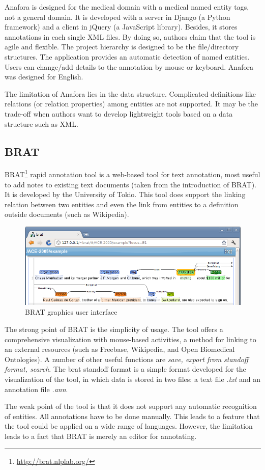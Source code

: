 Anafora is designed for the medical domain with a medical named entity tags, not a general domain.
It is developed with a server in Django (a Python framework) and a client in jQuery (a JavaScript library).
Besides, it stores annotations in each single XML files.
By doing so, authors claim that the tool is agile and flexible.
The project hierarchy is designed to be the file/directory structures.
The application provides an automatic detection of named entities.
Users can change/add details to the annotation by mouse or keyboard.
Anafora was designed for English.

The limitation of Anafora lies in the data structure.
Complicated definitions like relations (or relation properties) among entities
are not supported. It may be the trade-off when authors want to develop lightweight
tools based on a data structure such as XML.

\subsection{BRAT}

BRAT\footnote{\url{http://brat.nlplab.org/}} rapid annotation tool is a web-based tool for text annotation,
most useful to add notes to existing text documents (taken from the introduction of BRAT).
It is developed by the University of Tokio.
This tool does support the linking relation between two entities and even the link from entities to a definition outside documents (such as Wikipedia).

\begin{figure}[!htb]
	\centering
	\includegraphics[width=\textwidth]{Images/brat}
	\caption{BRAT graphics user interface}
	\label{fig:Second}
\end{figure}

The strong point of BRAT is the simplicity of usage.
The tool offers a comprehensive visualization with mouse-based activities,
a method for linking to an external resources (such as Freebase, Wikipedia, and Open Biomedical Ontologies).
A number of other useful functions are \textit{save, export from standoff format, search}.
The brat standoff format is a simple format developed for the visualization of the tool,
in which data is stored in two files: a text file \textit{.txt} and an annotation file \textit{.ann}.

The weak point of the tool is that it does not support any automatic recognition of entities.
All annotations have to be done manually.
This leads to a feature that the tool could be applied on a wide range of languages.
However, the limitation leads to a fact that BRAT is merely an editor for annotating.
